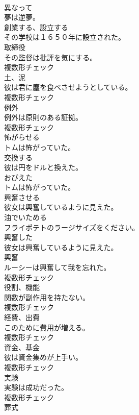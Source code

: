 \documentclass[8pt]{extreport}
\begin{document}
\begin{CJK}{UTF8}{min}
\\	[副詞]	異なって	
\\	夢は逆夢。	
\\	[動詞]	創業する、設立する	
\\	その学校は１６５０年に設立された。	
\\	[名詞]	取締役	
\\	その監督は批評を気にする。	
\\	複数形チェック
\\	[名詞]	土、泥	
\\	彼は君に塵を食べさせようとしている。	
\\	複数形チェック
\\	[名詞]	例外	
\\	例外は原則のある証拠。	
\\	複数形チェック
\\	[動詞]	怖がらせる	
\\	トムは怖がっていた。	
\\	[動詞]	交換する	
\\	彼は円をドルと換えた。	
\\	[形容詞]	おびえた	
\\	トムは怖がっていた。	
\\	[動詞]	興奮させる	
\\	彼女は興奮しているように見えた。	
\\	[動詞]	油でいためる	
\\	フライポテトのラージサイズをください。	
\\	[形容詞]	興奮した	
\\	彼女は興奮しているように見えた。	
\\	[名詞]	興奮	
\\	ルーシーは興奮して我を忘れた。	
\\	複数形チェック
\\	[名詞]	役割、機能	
\\	関数が副作用を持たない。	
\\	複数形チェック
\\	[名詞]	経費、出費	
\\	このために費用が増える。	
\\	複数形チェック
\\	[名詞]	資金、基金	
\\	彼は資金集めが上手い。	
\\	複数形チェック
\\	[名詞]	実験	
\\	実験は成功だった。	
\\	複数形チェック
\\	[名詞]	葬式	

\end{CJK}
\end{document}
